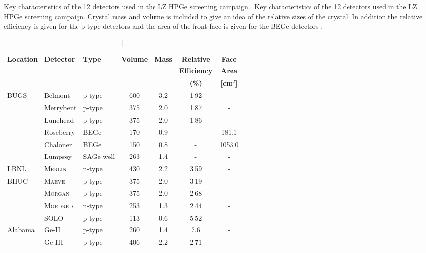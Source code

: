 \begin{table}[h]
\centering
\caption
[Key characteristics of the 12 detectors used in the LZ HPGe screening campaign.]
{Key characteristics of the 12 detectors used in the LZ HPGe screening campaign. Crystal mass and volume is included to give an idea of the relative sizes of the crystal. In addition the relative efficiency is given for the p-type detectors and the area of the front face is given for the BEGe detectors \cite{lz_screening}.}
    \label{tab:GeDetInf}
    \vspace{1mm}

    \renewcommand{\arraystretch}{1.2}
    \begin{tabularx}{1.0\linewidth}{@{\extracolsep{\fill}}lllcccc}
    \toprule
    
    \multirow{3}{*}{\textbf{Location}} & %
    \multirow{3}{*}{\textbf{Detector}} & %
    \multirow{3}{*}{\textbf{Type}} & %
    \multirow{2}{*}{\textbf{Volume}} & %
    \multirow{2}{*}{\textbf{Mass}} & %
    \textbf{Relative} & %
    \textbf{Face} %
    \\
    &
    & %
    & %
    \multirow{2}{*}{\textbf{[cm$^{3}$]}} & %
    \multirow{2}{*}{\textbf{[kg]}} & %
    \textbf{Efficiency} & %
    \textbf{Area} %
    \\
    &
    & %
    & %
    & %
    & %
    \textbf{(\%)} & %
    \textbf{[cm$^{2}$]} %
    \\
    \hline
    \hline

    \multirow{6}{*}{BUGS} & Belmont & p-type & 600 & 3.2 & 1.92 & - \\
    & Merrybent & p-type & 375 & 2.0 & 1.87 & - \\
    & Lunehead & p-type & 375 & 2.0 & 1.86 & - \\
    & Roseberry & BEGe & 170 & 0.9 & - & 181.1 \\
    & Chaloner & BEGe & 150 & 0.8 & - & 1053.0 \\
    & Lumpsey & SAGe well & 263 & 1.4 & - & - \\
    \hline
    LBNL & \textsc{Merlin} & n-type & 430 & 2.2 &3.59 & - \\
    \hline
    \multirow{4}{*}{BHUC}& \textsc{Maeve} & p-type & 375 & 2.0 &3.19 & - \\
    & \textsc{Morgan} & p-type & 375 & 2.0 & 2.68 & - \\
    & \textsc{Mordred} & n-type & 253 & 1.3 &2.44 & - \\
    & SOLO & p-type & 113 & 0.6 & 5.52 & - \\
    \hline
    \multirow{2}{*}{Alabama} & Ge-II  & p-type & 260 & 1.4 & 3.6  & - \\
    & Ge-III & p-type & 406 & 2.2 & 2.71 & - \\
    
    \bottomrule
    \end{tabularx}
\end{table}